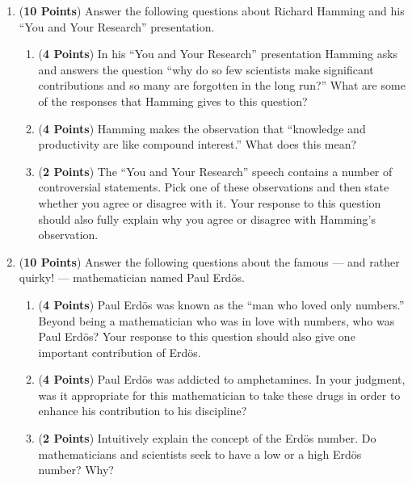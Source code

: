 \documentclass[12pt]{article}
\begin{document}
\begin{enumerate}

\item ({\bf 10 Points}) Answer the following questions about Richard
  Hamming and his ``You and Your Research'' presentation.


\begin{enumerate}

\item ({\bf 4 Points}) In his ``You and Your Research'' presentation
  Hamming asks and answers the question ``why do so few scientists
  make significant contributions and so many are forgotten in the long
  run?''  What are some of the responses that Hamming gives to this
  question?

\item ({\bf 4 Points}) Hamming makes the observation that ``knowledge
  and productivity are like compound interest.''  What does this mean?

\item ({\bf 2 Points}) The ``You and Your Research'' speech contains a
  number of controversial statements.  Pick one of these observations
  and then state whether you agree or disagree with it.  Your response
  to this question should also fully explain why you agree or
  disagree with Hamming's observation.

\end{enumerate}

\newpage

\item ({\bf 10 Points}) Answer the following questions about the
  famous --- and rather quirky! --- mathematician named Paul
  Erd\"{o}s.

\begin{enumerate}

\item ({\bf 4 Points}) Paul Erd\"{o}s was known as the ``man who loved
  only numbers.''  Beyond being a mathematician who was in love with
  numbers, who was Paul Erd\"{o}s?  Your response to this question
  should also give one important contribution of Erd\"{o}s.

\item ({\bf 4 Points}) Paul Erd\"{o}s was addicted to amphetamines.
  In your judgment, was it appropriate for this mathematician to take
  these drugs in order to enhance his contribution to his discipline?

\item ({\bf 2 Points}) Intuitively explain the concept of the
  Erd\"{o}s number.  Do mathematicians and scientists seek to have a
  low or a high Erd\"{o}s number?  Why?


\end{enumerate}
\end{enumerate}
\end{document}

